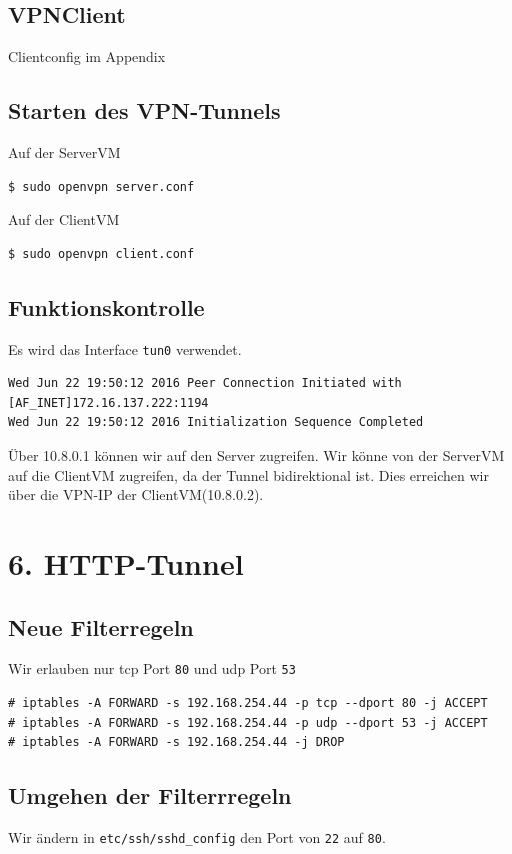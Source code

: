 \documentclass[10pt,a4paper]{article}
\begin{document}
\subsection{VPNClient}
Clientconfig im Appendix

\subsection{Starten des VPN-Tunnels}
Auf der ServerVM
\begin{verbatim}
$ sudo openvpn server.conf
\end{verbatim}
Auf der ClientVM
\begin{verbatim}
$ sudo openvpn client.conf
\end{verbatim}

\subsection{Funktionskontrolle}
Es wird das Interface \texttt{tun0} verwendet.
\begin{verbatim}
Wed Jun 22 19:50:12 2016 Peer Connection Initiated with [AF_INET]172.16.137.222:1194
Wed Jun 22 19:50:12 2016 Initialization Sequence Completed
\end{verbatim}
Über 10.8.0.1 können wir auf den Server zugreifen.
Wir könne von der ServerVM auf die ClientVM zugreifen, da der Tunnel bidirektional ist. Dies erreichen wir über die VPN-IP der ClientVM(10.8.0.2).
\setcounter{section}{6}
\section*{6. HTTP-Tunnel}
\setcounter{subsection}{0}
\subsection{Neue Filterregeln}
Wir erlauben nur tcp Port \texttt{80} und udp Port \texttt{53}
\begin{verbatim}
# iptables -A FORWARD -s 192.168.254.44 -p tcp --dport 80 -j ACCEPT
# iptables -A FORWARD -s 192.168.254.44 -p udp --dport 53 -j ACCEPT
# iptables -A FORWARD -s 192.168.254.44 -j DROP
\end{verbatim}

\subsection{Umgehen der Filterrregeln}
Wir ändern in \texttt{etc/ssh/sshd_config} den Port von \texttt{22} auf \texttt{80}.
\end{document}
